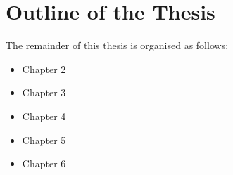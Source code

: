\section{Outline of the Thesis}
The remainder of this thesis is organised as follows:

\begin{itemize}
	\item Chapter 2
	\item Chapter 3
	\item Chapter 4
	\item Chapter 5
	\item Chapter 6
\end{itemize}

